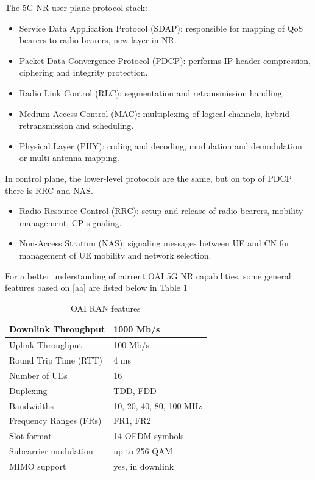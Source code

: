 \documentclass[12pt,a4paper,twoside]{report}
\begin{document}
The 5G NR user plane protocol stack:
\begin{itemize}
	\item Service Data Application Protocol (SDAP): responsible for mapping of QoS bearers to radio bearers, new layer in NR.
	\item Packet Data Convergence Protocol (PDCP): performs IP header compression, ciphering and integrity protection.
	\item Radio Link Control (RLC): segmentation and retransmission handling.
	\item Medium Access Control (MAC): multiplexing of logical channels, hybrid retransmission and scheduling.
	\item Physical Layer (PHY): coding and decoding, modulation and demodulation or multi-antenna mapping.
\end{itemize}
In control plane, the lower-level protocols are the same, but on top of PDCP there is RRC and NAS.
\begin{itemize}
	\item Radio Resource Control (RRC): setup and release of radio bearers, mobility management, CP signaling.
	\item Non-Access Stratum (NAS): signaling messages between UE and CN for management of UE mobility and network selection.
\end{itemize}
For a better understanding of current OAI 5G NR capabilities, some general features based on [aa] are listed below in Table \ref{T:OAI-featureset}
\begin{table}[!ht]
    \centering
    \caption{OAI RAN features}
    \begin{tabular}{|l|l|}
    \hline
        Downlink Throughput & 1000 Mb/s \\ \hline
        Uplink Throughput & 100 Mb/s \\ \hline
        Round Trip Time (RTT) & 4 ms \\ \hline
        Number of UEs & 16 \\ \hline
        Duplexing & TDD, FDD \\ \hline
        Bandwidths & 10, 20, 40, 80, 100 MHz \\ \hline
        Frequency Ranges (FRs) & FR1, FR2 \\ \hline
        Slot format & 14 OFDM symbols \\ \hline
        Subcarrier modulation & up to 256 QAM \\ \hline
        MIMO support & yes, in downlink \\ \hline
    \end{tabular}
    \label{T:OAI-featureset}
\end{table}
\end{document}
